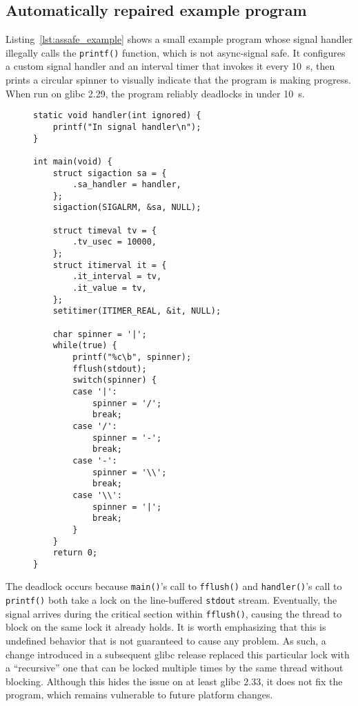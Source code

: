 \subsection{Automatically repaired example program}
\label{sec:safety:handler}

Listing~\ref{lst:assafe_example} shows a small example program whose signal handler
illegally calls the \texttt{printf()} function, which is not async-signal safe.  It
configures a custom signal handler and an interval timer that invokes it every
10~\textmu{}s, then prints a circular spinner to visually indicate that the program is
making progress.  When run on glibc 2.29, the program reliably deadlocks in under
10~s.

\begin{figure}
\begin{lstlisting}[label=lst:assafe_example,caption=Example program with a signal handler that causes undefined behavior]
static void handler(int ignored) {
	printf("In signal handler\n");
}

int main(void) {
	struct sigaction sa = {
		.sa_handler = handler,
	};
	sigaction(SIGALRM, &sa, NULL);

	struct timeval tv = {
		.tv_usec = 10000,
	};
	struct itimerval it = {
		.it_interval = tv,
		.it_value = tv,
	};
	setitimer(ITIMER_REAL, &it, NULL);

	char spinner = '|';
	while(true) {
		printf("%c\b", spinner);
		fflush(stdout);
		switch(spinner) {
		case '|':
			spinner = '/';
			break;
		case '/':
			spinner = '-';
			break;
		case '-':
			spinner = '\\';
			break;
		case '\\':
			spinner = '|';
			break;
		}
	}
	return 0;
}
\end{lstlisting}
\end{figure}

The deadlock occurs because \texttt{main()}'s call to \texttt{fflush()} and
\texttt{handler()}'s call to \texttt{printf()} both take a lock on the line-buffered
\texttt{stdout} stream.  Eventually, the signal arrives during the critical section
within \texttt{fflush()}, causing the thread to block on the same lock it already
holds.  It is worth emphasizing that this is undefined behavior that is not
guaranteed to cause any problem.  As such, a change introduced in a subsequent glibc
release replaced this particular lock with a ``recursive'' one that can be locked
multiple times by the same thread without blocking.  Although this hides the issue on
at least glibc 2.33, it does not fix the program, which remains vulnerable to future
platform changes.

